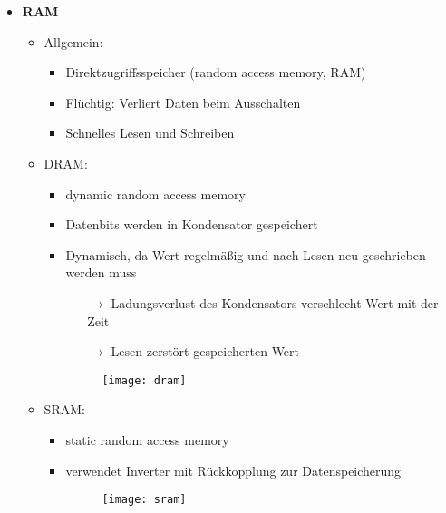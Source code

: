 \begin{itemize}
\pagebreak

\item \textbf{RAM}
	\begin{itemize}
	\item Allgemein:
		\begin{itemize}
		\item Direktzugriffsspeicher (random access memory, RAM)
		\item Flüchtig: Verliert Daten beim Ausschalten
		\item Schnelles Lesen und Schreiben
		\end{itemize}
	\item DRAM:
		\begin{itemize}
		\item dynamic random access memory
		\item Datenbits werden in Kondensator gespeichert
		\item Dynamisch, da Wert regelmäßig und nach Lesen neu geschrieben werden muss
			\begin{itemize}
			\item[$\rightarrow$] Ladungsverlust des Kondensators verschlecht Wert mit der Zeit
			\item[$\rightarrow$] Lesen zerstört gespeicherten Wert
			\end{itemize}
		\item[]
			\begin{figure}[H]
			\begin{center}
			\texttt{[image: dram]}
			\end{center}
			\end{figure}
		\end{itemize}
		
	\item SRAM:
		\begin{itemize}
		\item static random access memory
		\item verwendet Inverter mit Rückkopplung zur Datenspeicherung
		\item[]
			\begin{figure}[H]
			\begin{center}
			\texttt{[image: sram]}
			\end{center}
			\end{figure}
		\end{itemize}
	\end{itemize}
	

\end{itemize}
